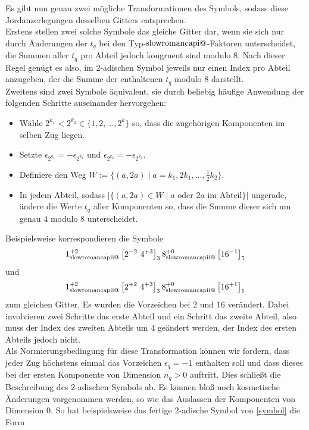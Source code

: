 \documentclass[12pt,a4paper,halfparskip,headsepline,bibtotocnumbered]{scrreprt}
\makeatletter
\theoremstyle{nummermitklammern}
\theoremstyle{nonumberbreak}
\renewcommand{\i}{\text{\expandafter\@slowromancap\romannumeral 1@}}
\newcommand{\ii}{\text{\expandafter\@slowromancap\romannumeral 2@}}
\makeatother
\begin{document}
Es gibt nun genau zwei mögliche Transformationen des Symbols, sodass diese Jordanzerlegungen desselben Gitters entsprechen.\\
Erstens stellen zwei solche Symbole das gleiche Gitter dar, wenn sie sich nur durch Änderungen der $t_q$ bei den Typ-$\i$-Faktoren unterscheidet, die Summen aller $t_q$ pro Abteil jedoch kongruent sind modulo $8$. Nach dieser Regel genügt es also, im $2$-adischen Symbol jeweils nur einen Index pro Abteil anzugeben, der die Summe der enthaltenen $t_q$ modulo $8$ darstellt.\\
Zweitens sind zwei Symbole äquivalent, sie durch beliebig häufige Anwendung der folgenden Schritte auseinander hervorgehen:
\begin{itemize}
	\item Wähle $2^{k_1} < 2^{k_2} \in \lbrace 1, 2, \dots, 2^k \rbrace$ so, dass die zugehörigen Komponenten im selben Zug liegen.
	\item Setzte $\epsilon_{2^{k_1}} = - \epsilon_{2^{k_1}}$ und $\epsilon_{2^{k_2}} = - \epsilon_{2^{k_2}}$.
	\item Definiere den Weg $W := \lbrace (a,2a) \mid a = k_1, 2 k_1, \dots, \frac{1}{2}k_2 \rbrace$.
	\item In jedem Abteil, sodass $\vert \lbrace (a, 2a) \in W \mid a \text{ oder } 2a \text{ im Abteil} \rbrace \vert$ ungerade, ändere die Werte $t_q$ aller Komponenten so, dass die Summe dieser sich um genau $4$ modulo $8$ unterscheidet.
\end{itemize}
Beispielsweise korrespondieren die Symbole
\begin{equation*}
	1_{\ii}^{+2} \left[ 2^{-2}\ 4^{+3} \right]_3 8_{\ii}^{+0} \left[ 16^{-1} \right]_5
\end{equation*}
und
\begin{equation*}
	1_{\ii}^{+2} \left[ 2^{+2}\ 4^{+3} \right]_3 8_{\ii}^{+0} \left[ 16^{+1} \right]_1
\end{equation*}
zum gleichen Gitter. Es wurden die Vorzeichen bei $2$ und $16$ verändert. Dabei involvieren zwei Schritte das erste Abteil und ein Schritt das zweite Abteil, also muss der Index des zweiten Abteils um $4$ geändert werden, der Index des ersten Abteils jedoch nicht.\\
Als Normierungsbedingung für diese Transformation können wir fordern, dass jeder Zug höchstens einmal das Vorzeichen $\epsilon_q = -1$ enthalten soll und dass dieses bei der ersten Komponente von Dimension $n_q > 0$ auftritt. Dies schließt die Beschreibung des $2$-adischen Symbols ab. Es können bloß noch kosmetische Änderungen vorgenommen werden, so wie das Auslassen der Komponenten von Dimension $0$. So hat beispielsweise das fertige $2$-adische Symbol von \eqref{symbol} die Form
\end{document}
